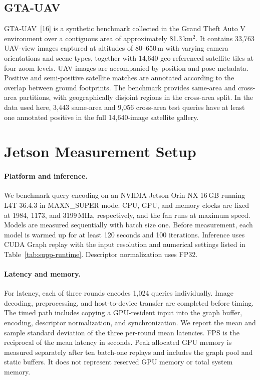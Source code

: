 \subsection{GTA-UAV}
GTA-UAV~[16] is a synthetic benchmark collected in the Grand Theft Auto V environment over a contiguous area of approximately 81.3\,km$^2$. It contains 33,763 UAV-view images captured at altitudes of 80--650\,m with varying camera orientations and scene types, together with 14,640 geo-referenced satellite tiles at four zoom levels. UAV images are accompanied by position and pose metadata. Positive and semi-positive satellite matches are annotated according to the overlap between ground footprints. The benchmark provides same-area and cross-area partitions, with geographically disjoint regions in the cross-area split. In the data used here, 3,443 same-area and 9,056 cross-area test queries have at least one annotated positive in the full 14,640-image satellite gallery.

\section{Jetson Measurement Setup}
\label{sec:supp-deployment}

\paragraph{Platform and inference.}
We benchmark query encoding on an NVIDIA Jetson Orin NX 16\,GB running L4T 36.4.3 in MAXN\_SUPER mode. CPU, GPU, and memory clocks are fixed at 1984, 1173, and 3199\,MHz, respectively, and the fan runs at maximum speed. Models are measured sequentially with batch size one. Before measurement, each model is warmed up for at least 120 seconds and 100 iterations. Inference uses CUDA Graph replay with the input resolution and numerical settings listed in Table~\ref{tab:supp-runtime}. Descriptor normalization uses FP32.

\paragraph{Latency and memory.}
For latency, each of three rounds encodes 1,024 queries individually. Image decoding, preprocessing, and host-to-device transfer are completed before timing. The timed path includes copying a GPU-resident input into the graph buffer, encoding, descriptor normalization, and synchronization. We report the mean and sample standard deviation of the three per-round mean latencies. FPS is the reciprocal of the mean latency in seconds. Peak allocated GPU memory is measured separately after ten batch-one replays and includes the graph pool and static buffers. It does not represent reserved GPU memory or total system memory.

